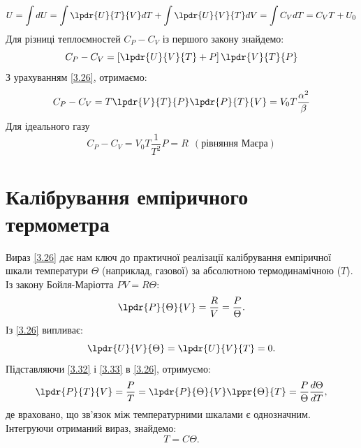 \begin{equation}\label{3.28}
	U = \int dU = \int\lpdr{U}{T}{V}dT+\int\lpdr{U}{V}{T}dV=\int C_VdT=C_VT+U_0
\end{equation}
Для різниці теплоємностей $C_P - C_V$ із першого закону знайдемо:
\begin{equation}\label{3.29}
	C_P - C_V = \left[\lpdr{U}{V}{T} + P\right]\lpdr{V}{T}{P}
\end{equation}
З урахуванням \eqref{3.26}, отримаємо:
\begin{equation}\label{3.30}
	C_P - C_V = T\lpdr{V}{T}{P}\lpdr{P}{T}{V} = V_0T\dfrac{\alpha^2}{\beta}
\end{equation}
Для ідеального газу
\begin{equation}\label{3.31}
	C_P-C_V = V_0T\dfrac{1}{T^2}P=R ~~ (\text{рівняння Маєра})
\end{equation}

\section{Калібрування емпіричного термометра}

Вираз \eqref{3.26} дає нам ключ до практичної реалізації калібрування емпіричної шкали температури
$\Theta$ (наприклад, газової) за абсолютною термодинамічною ($T$). Із закону Бойля-Маріотта
$PV=R\Theta$:
\begin{equation}\label{3.32}
	\lpdr{P}{\Theta}{V} = \dfrac{R}{V} = \dfrac{P}{\Theta}.
\end{equation}
Із \eqref{3.26} випливає:
\begin{equation}\label{3.33}
	\lpdr{U}{V}{\Theta} = \lpdr{U}{V}{T} = 0.
\end{equation}
Підставляючи \eqref{3.32} і \eqref{3.33} в \eqref{3.26}, отримуємо:
\begin{equation}\label{3.34}
	\lpdr{P}{T}{V} = \dfrac{P}{T} = \lpdr{P}{\Theta}{V} \lppr{\Theta}{T} = \dfrac{P}{\Theta}\dfrac{d\Theta}{dT},
\end{equation}
де враховано, що зв'язок між температурними шкалами є однозначним. Інтегруючи отриманий вираз, знайдемо:
\begin{equation}\label{3.35}
	T = C\Theta.
\end{equation}

